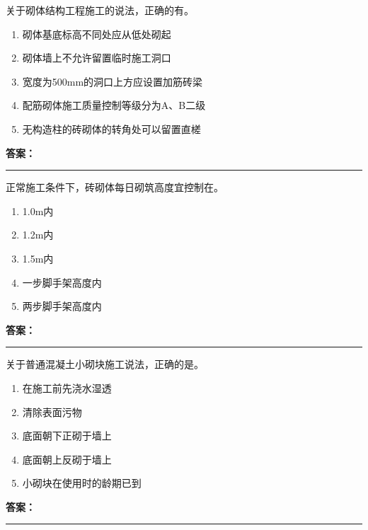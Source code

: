 \documentclass[UTF8,fontset=fandol,11pt]{ctexart}
\newcommand{\answerline}{\textcolor{answerred}{\rule{2.4cm}{0.7pt}}}
\begin{document}
\begin{quizbox}[title={第 25 题}]
关于砌体结构工程施工的说法，正确的有。\\
\begin{enumerate}[label=\Alph*.]
\item 砌体基底标高不同处应从低处砌起
\item 砌体墙上不允许留置临时施工洞口
\item 宽度为500mm的洞口上方应设置加筋砖梁
\item 配筋砌体施工质量控制等级分为A、B二级
\item 无构造柱的砖砌体的转角处可以留置直槎
\end{enumerate}
\textbf{\textcolor{answerred}{答案：}} \answerline
\end{quizbox}

\vspace{0.2em}

\begin{quizbox}[title={第 26 题}]
正常施工条件下，砖砌体每日砌筑高度宜控制在。\\
\begin{enumerate}[label=\Alph*.]
\item 1.0m内
\item 1.2m内
\item 1.5m内
\item 一步脚手架高度内
\item 两步脚手架高度内
\end{enumerate}
\textbf{\textcolor{answerred}{答案：}} \answerline
\end{quizbox}

\vspace{0.2em}

\begin{quizbox}[title={第 27 题}]
关于普通混凝土小砌块施工说法，正确的是。\\
\begin{enumerate}[label=\Alph*.]
\item 在施工前先浇水湿透
\item 清除表面污物
\item 底面朝下正砌于墙上
\item 底面朝上反砌于墙上
\item 小砌块在使用时的龄期已到
\end{enumerate}
\textbf{\textcolor{answerred}{答案：}} \answerline
\end{quizbox}

\vspace{0.2em}
\end{document}
